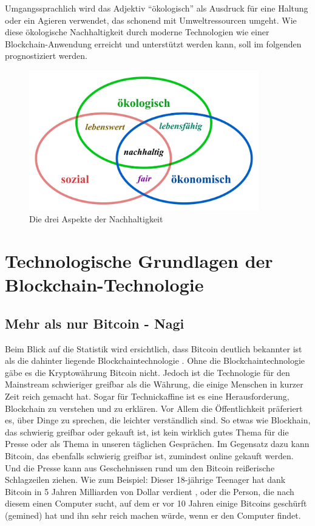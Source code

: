 Umgangssprachlich wird das Adjektiv ``ökologisch'' als Ausdruck für eine Haltung oder ein Agieren verwendet, das schonend mit Umweltressourcen umgeht\cite[13-23]{test123}. Wie diese ökologische Nachhaltigkeit durch moderne Technologien wie einer Blockchain-Anwendung erreicht und unterstützt werden kann, soll im folgenden prognostiziert werden.

\begin{figure}[ht!]
	\centering
	\includegraphics[width=100mm]{nachhaltig.jpg}
	\caption{Die drei Aspekte der Nachhaltigkeit\cite{oekologischeN} \label{overflow}}
\end{figure} 
\chapter{Technologische Grundlagen der Blockchain-Technologie}
\section{Mehr als nur Bitcoin - Nagi}
Beim Blick auf die Statistik wird ersichtlich, dass Bitcoin deutlich bekannter ist als die dahinter liegende Blockchaintechnologie \cite{Gbtcvsbc21}. Ohne die Blockchaintechnologie gäbe es die Kryptowährung Bitcoin nicht. Jedoch ist die Technologie für den Mainstream schwieriger greifbar als die Währung, die einige Menschen in kurzer Zeit reich gemacht hat. Sogar für Technickaffine ist es eine Herausforderung, Blockchain zu verstehen und zu erklären. Vor Allem die Öffentlichkeit präferiert es, über Dinge zu sprechen, die leichter verständlich sind. So etwas wie Blockhain, das schwierig greifbar oder gekauft %
ist, ist kein wirklich gutes Thema für die Presse oder als Thema in unseren täglichen Gesprächen. Im Gegensatz dazu kann Bitcoin, das ebenfalls schwierig greifbar ist, zumindest online gekauft werden. Und die Presse kann aus Geschehnissen rund um den Bitcoin reißerische Schlagzeilen ziehen. Wie zum Beispiel: Dieser 18-jährige Teenager hat dank Bitcoin in 5 Jahren Milliarden von Dollar verdient \cite{Jeff18}, oder die Person, die nach diesem einen Computer sucht, auf dem er vor 10 Jahren einige Bitcoins geschürft (gemined) hat und ihn sehr reich machen würde, wenn er den Computer findet. 

